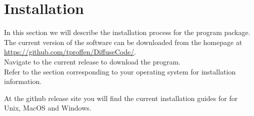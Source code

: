
\chapter{Installation \label{app-install}}

In this section we will describe the installation process
for the \Suite program package. 
The current version of the
software can be downloaded from the \Discus homepage at \\
\url{
https://github.com/tproffen/DiffuseCode/}. \\
Navigate to the current release to download the program.\\

Refer to the section corresponding
to your operating system for installation information.

At the github release site you will find the current installation 
guides for \Discus for Unix, MacOS and Windows.





